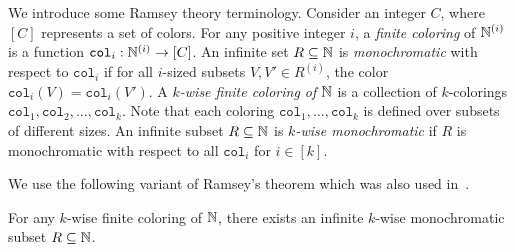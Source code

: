 We introduce some Ramsey theory terminology. 
Consider an integer $C$, where $[C]$ represents a set of colors.
For any positive integer $i$, a {\em finite coloring} of $\mathbb N^{(i)}$ is a function $\texttt{col}_i:\mathbb N^{(i)} \to [C]$.
An infinite set $R \subseteq \mathbb N$ is {\em monochromatic} with respect to $\texttt{col}_i$ if for all $i$-sized subsets $V, V' \in R^{(i)}$, the color $\texttt{col}_i(V) = \texttt{col}_i(V')$. A {\em $k$-wise finite coloring of $\mathbb N$} is a collection of $k$-colorings $\texttt{col}_1, \texttt{col}_2, \ldots, \texttt{col}_k$.
Note that each coloring $\texttt{col}_1, \ldots, \texttt{col}_k$ is defined over subsets of different sizes.
An infinite subset $R \subseteq \mathbb N$ is {\em $k$-wise monochromatic}  if $R$ is monochromatic with respect to all $\texttt{col}_i$ for $i \in [k]$.

We use the following variant of Ramsey's theorem which was also used in~\cite{Fis04,CS14}.

\begin{theorem}\label{thm:ramsey}
For any $k$-wise finite coloring of $\mathbb N$, there exists an infinite $k$-wise monochromatic subset $R \subseteq \mathbb N$.
\end{theorem}



